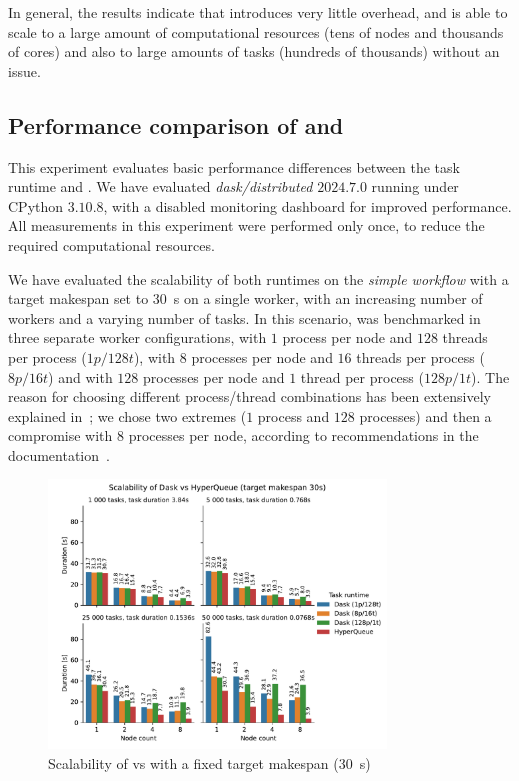 In general, the results indicate that \hyperqueue{} introduces very little overhead, and
is able to scale to a large amount of computational resources (tens of nodes and thousands of
cores) and also to large amounts of tasks (hundreds of thousands) without an issue.

\subsection{Performance comparison of \dask{} and \hq{}}
\label{sec:hq-exp-dask}
This experiment evaluates basic performance differences between the \dask{} task
runtime and \hyperqueue{}. We have evaluated \emph{dask/distributed}
$2024.7.0$ running under CPython $3.10.8$, with a disabled monitoring
dashboard for improved performance. All measurements in this experiment were performed only once,
to reduce the required computational resources.

We have evaluated the scalability of both runtimes on the \emph{simple workflow} with a target
makespan set to \SI{30}{\second} on a single worker, with an increasing number of workers
and a varying number of tasks. In this scenario, \dask{} was benchmarked in three
separate worker configurations, with $1$ process per node and
$128$ threads per process ($1p/128t$), with $8$
processes per node and $16$ threads per process ($8p/16t$) and
with $128$ processes per node and $1$ thread per process
($128p/1t$). The reason for choosing different process/thread combinations has been
extensively explained in~; we chose two extremes ($1$
process and $128$ processes) and then a compromise with $8$
processes per node, according to recommendations in the \dask{}
documentation~\cite{dask-thread-recommendation}.

\begin{figure}[h]
	\centering
	\includegraphics[width=0.8\textwidth]{imgs/hq/charts/dask-vs-hq-sleep}
	\caption{Scalability of \hyperqueue{} vs \dask{} with a fixed target makespan
	(\SI{30}{\second})}
	\label{fig:hq-dask-sleep}
\end{figure}

